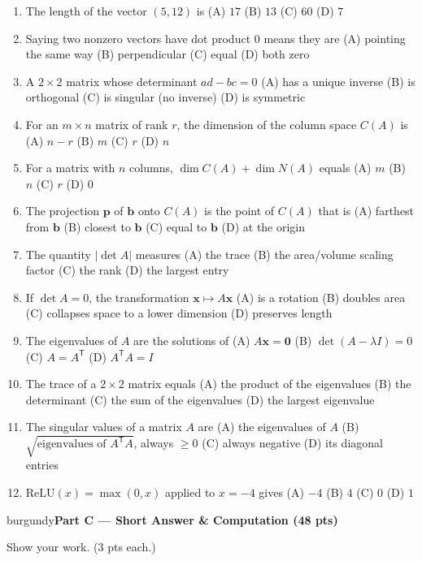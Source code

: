 \documentclass[10pt]{article}
\newcommand{\xx}{\mathbf{x}}
\newcommand{\bb}{\mathbf{b}}
\newcommand{\pp}{\mathbf{p}}
\newcommand{\zero}{\mathbf{0}}
\newcommand{\relu}{\mathrm{ReLU}}
\newcommand{\T}{\mathsf{T}}
\newcommand{\parthead}[1]{%
  \vspace{6pt}\noindent
  \begin{headlinebox}{burgundy}{\color{white}\bfseries #1}\end{headlinebox}%
  \vspace{4pt}}
\begin{document}
\begin{enumerate}[leftmargin=1.9em, itemsep=8pt]
  \item The length of the vector $(5,12)$ is
    \hfill (A) $17$ \quad (B) $13$ \quad (C) $60$ \quad (D) $7$
  \item Saying two nonzero vectors have dot product $0$ means they are
    \hfill (A) pointing the same way \quad (B) perpendicular \quad (C) equal \quad (D) both zero
  \item A $2\times2$ matrix whose determinant $ad-bc=0$
    \hfill (A) has a unique inverse \quad (B) is orthogonal \quad (C) is singular (no inverse) \quad (D) is symmetric
  \item For an $m\times n$ matrix of rank $r$, the dimension of the column space $C(A)$ is
    \hfill (A) $n-r$ \quad (B) $m$ \quad (C) $r$ \quad (D) $n$
  \item For a matrix with $n$ columns, $\dim C(A)+\dim N(A)$ equals
    \hfill (A) $m$ \quad (B) $n$ \quad (C) $r$ \quad (D) $0$
  \item The projection $\pp$ of $\bb$ onto $C(A)$ is the point of $C(A)$ that is
    \hfill (A) farthest from $\bb$ \quad (B) closest to $\bb$ \quad (C) equal to $\bb$ \quad (D) at the origin
  \item The quantity $|\det A|$ measures
    \hfill (A) the trace \quad (B) the area/volume scaling factor \quad (C) the rank \quad (D) the largest entry
  \item If $\det A=0$, the transformation $\xx\mapsto A\xx$
    \hfill (A) is a rotation \quad (B) doubles area \quad (C) collapses space to a lower dimension \quad (D) preserves length
  \item The eigenvalues of $A$ are the solutions of
    \hfill (A) $A\xx=\zero$ \quad (B) $\det(A-\lambda I)=0$ \quad (C) $A=A^\T$ \quad (D) $A^\T A=I$
  \item The trace of a $2\times2$ matrix equals
    \hfill (A) the product of the eigenvalues \quad (B) the determinant \quad (C) the sum of the eigenvalues \quad (D) the largest eigenvalue
  \item The singular values of a matrix $A$ are
    \hfill (A) the eigenvalues of $A$ \quad (B) $\sqrt{\text{eigenvalues of }A^\T A}$, always $\ge0$ \quad (C) always negative \quad (D) its diagonal entries
  \item $\relu(x)=\max(0,x)$ applied to $x=-4$ gives
    \hfill (A) $-4$ \quad (B) $4$ \quad (C) $0$ \quad (D) $1$
\end{enumerate}

\parthead{Part C --- Short Answer \& Computation (48 pts)}
Show your work. ($3$ pts each.)
\end{document}
